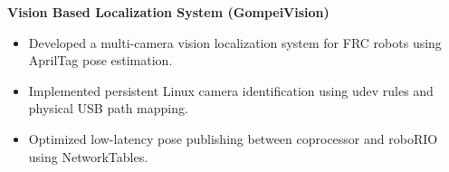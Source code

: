 \textbf{Vision Based Localization System (GompeiVision)}
\begin{itemize}
  \item Developed a multi-camera vision localization system for FRC robots using AprilTag pose estimation.
  \item Implemented persistent Linux camera identification using udev rules and physical USB path mapping.
  \item Optimized low-latency pose publishing between coprocessor and roboRIO using NetworkTables.
\end{itemize}

